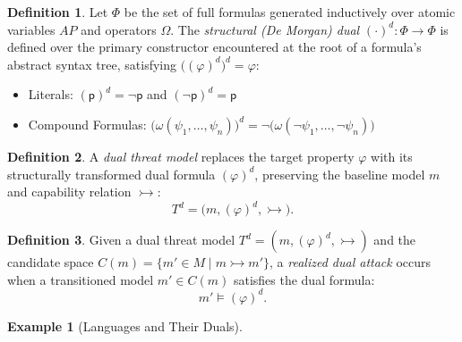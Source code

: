 \documentclass[11pt]{amsart}
\theoremstyle{definition}
\newtheorem{definition}{Definition}
\newtheorem{example}{Example}
\theoremstyle{remark}
\newcommand{\adv}{\rightarrowtail}   %
\newcommand{\AP}{\mathit{AP}}
\begin{document}
\begin{definition}
Let $\Phi$ be the set of full formulas generated inductively over atomic variables $\AP$ and operators $\Omega$. The
\emph{structural (De Morgan) dual} $(\cdot)^{d} : \Phi \to \Phi$ is defined over the primary constructor encountered at the root
of a formula's abstract syntax tree, satisfying $\big((\varphi)^{d}\big)^{d} = \varphi$:
\begin{itemize}
  \item Literals: $(\mathsf{p})^{d} = \neg \mathsf{p}$ and $(\neg \mathsf{p})^{d} = \mathsf{p}$
  \item Compound Formulas: $\big(\omega(\psi_1, \ldots, \psi_n)\big)^{d} = \neg\big(\omega(\neg\psi_1, \ldots, \neg\psi_n)\big)$
\end{itemize}
\end{definition}

\begin{definition}
A \emph{dual threat model} replaces the target property $\varphi$ with its structurally transformed dual formula $(\varphi)^{d}$,
preserving the baseline model $m$ and capability relation $\adv$:
\[
  T^{d} = \big(m, (\varphi)^{d}, \adv\big).
\]
\end{definition}

\begin{definition}
Given a dual threat model $T^{d} = (m, (\varphi)^{d}, \adv)$ and the candidate space $C(m) = \{m' \in M \mid m \adv m'\}$, a
\emph{realized dual attack} occurs when a transitioned model $m' \in C(m)$ satisfies the dual formula:
\[
  m' \models (\varphi)^{d}.
\]
\end{definition}

\begin{example}[Languages and Their Duals]
\label{ex:duals}
\end{example}
\end{document}
